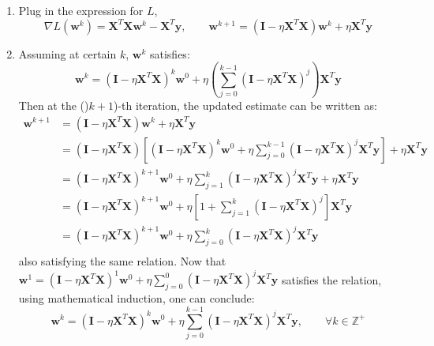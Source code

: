 \documentclass[a4paper, 10pt]{article}
\begin{document}
\begin{enumerate}[label=(\alph*)]
    \item Plug in the expression for $L$,
    \begin{equation}
        \nabla L (\mathbf{w}^k) = \mathbf{X}^T \mathbf{X} \mathbf{w}^k - \mathbf{X}^T \mathbf{y},\qquad 
        \mathbf{w}^{k+1} = \left(\mathbf{I} - \eta \mathbf{X}^T \mathbf{X}\right) \mathbf{w}^k + \eta \mathbf{X}^T \mathbf{y}
    \end{equation}
    
    \item Assuming at certain $k$, $\mathbf{w}^k$ satisfies:
    \begin{equation}
        \mathbf{w}^k = \left(\mathbf{I} - \eta \mathbf{X}^T \mathbf{X}\right)^k \mathbf{w}^0 + \eta \left(\sum_{j=0}^{k-1} \left(\mathbf{I} - \eta \mathbf{X}^T \mathbf{X}\right)^j \right) \mathbf{X}^T \mathbf{y}
    \end{equation}
    Then at the ()$k+1$)-th iteration, the updated estimate can be written as:
    \begin{equation}
        \begin{aligned}
            \mathbf{w}^{k+1} &= \left(\mathbf{I} - \eta \mathbf{X}^T \mathbf{X}\right) \mathbf{w}^k + \eta \mathbf{X}^T \mathbf{y} \\ 
            &= \left(\mathbf{I} - \eta \mathbf{X}^T \mathbf{X}\right) \left[\left(\mathbf{I} - \eta \mathbf{X}^T \mathbf{X}\right)^k \mathbf{w}^0 + \eta \sum_{j=0}^{k-1} \left(\mathbf{I} - \eta \mathbf{X}^T \mathbf{X}\right)^j  \mathbf{X}^T \mathbf{y}\right] + \eta \mathbf{X}^T \mathbf{y} \\ 
            &= \left(\mathbf{I} - \eta \mathbf{X}^T \mathbf{X}\right)^{k+1} \mathbf{w}^0 + \eta \sum_{j=1}^{k} \left(\mathbf{I} - \eta \mathbf{X}^T \mathbf{X}\right)^j \mathbf{X}^T \mathbf{y} + \eta \mathbf{X}^T \mathbf{y} \\ 
            &= \left(\mathbf{I} - \eta \mathbf{X}^T \mathbf{X}\right)^{k+1} \mathbf{w}^0 + \eta \left[1 + \sum_{j=1}^{k} \left(\mathbf{I} - \eta \mathbf{X}^T \mathbf{X}\right)^j \right] \mathbf{X}^T \mathbf{y} \\ 
            &= \left(\mathbf{I} - \eta \mathbf{X}^T \mathbf{X}\right)^{k+1} \mathbf{w}^0 + \eta \sum_{j=0}^{k} \left(\mathbf{I} - \eta \mathbf{X}^T \mathbf{X}\right)^j \mathbf{X}^T \mathbf{y} \\ 
        \end{aligned}
    \end{equation}
    also satisfying the same relation. Now that $\mathbf{w}^1 = \left(\mathbf{I} - \eta \mathbf{X}^T \mathbf{X}\right)^1 \mathbf{w}^0 + \eta \sum_{j=0}^0 \left(\mathbf{I} - \eta \mathbf{X}^T \mathbf{X}\right)^j \mathbf{X}^T \mathbf{y}$ satisfies the relation, using mathematical induction, one can conclude:
    \begin{equation}
        \mathbf{w}^k = \left(\mathbf{I} - \eta \mathbf{X}^T \mathbf{X}\right)^k \mathbf{w}^0 + \eta \sum_{j=0}^{k-1} \left(\mathbf{I} - \eta \mathbf{X}^T \mathbf{X}\right)^j \mathbf{X}^T \mathbf{y}, \qquad \forall k \in \mathbb{Z}^+
    \end{equation}
    

\end{enumerate}
\end{document}

